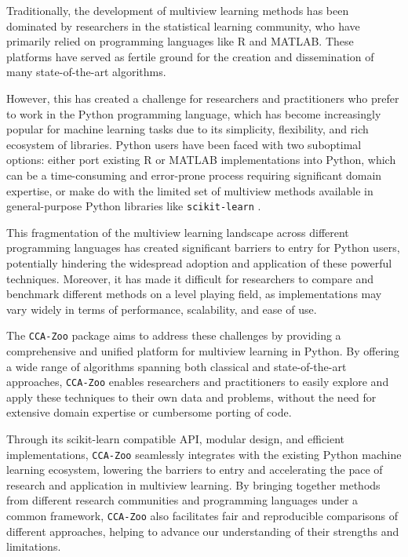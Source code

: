 Traditionally, the development of multiview learning methods has been dominated by researchers in the statistical learning community, who have primarily relied on programming languages like R and MATLAB. These platforms have served as fertile ground for the creation and dissemination of many state-of-the-art algorithms.

However, this has created a challenge for researchers and practitioners who prefer to work in the Python programming language, which has become increasingly popular for machine learning tasks due to its simplicity, flexibility, and rich ecosystem of libraries. Python users have been faced with two suboptimal options: either port existing R or MATLAB implementations into Python, which can be a time-consuming and error-prone process requiring significant domain expertise, or make do with the limited set of multiview methods available in general-purpose Python libraries like \texttt{scikit-learn} \citep{pedregosa2011scikit}.

This fragmentation of the multiview learning landscape across different programming languages has created significant barriers to entry for Python users, potentially hindering the widespread adoption and application of these powerful techniques. Moreover, it has made it difficult for researchers to compare and benchmark different methods on a level playing field, as implementations may vary widely in terms of performance, scalability, and ease of use.

The \texttt{CCA-Zoo} package aims to address these challenges by providing a comprehensive and unified platform for multiview learning in Python. By offering a wide range of algorithms spanning both classical and state-of-the-art approaches, \texttt{CCA-Zoo} enables researchers and practitioners to easily explore and apply these techniques to their own data and problems, without the need for extensive domain expertise or cumbersome porting of code.

Through its scikit-learn compatible API, modular design, and efficient implementations, \texttt{CCA-Zoo} seamlessly integrates with the existing Python machine learning ecosystem, lowering the barriers to entry and accelerating the pace of research and application in multiview learning. By bringing together methods from different research communities and programming languages under a common framework, \texttt{CCA-Zoo} also facilitates fair and reproducible comparisons of different approaches, helping to advance our understanding of their strengths and limitations.

